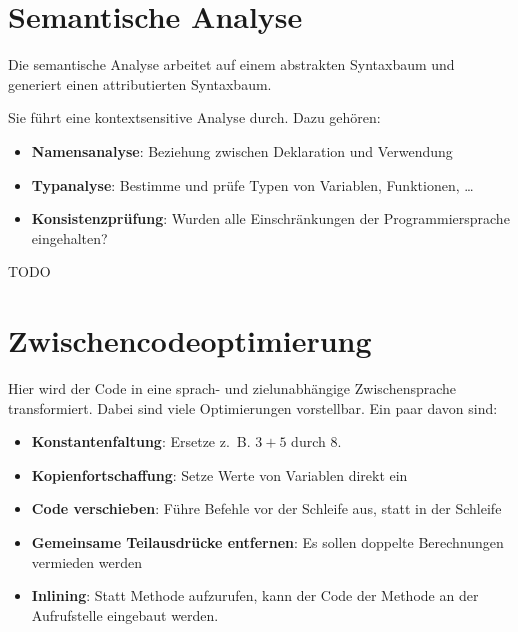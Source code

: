 \section{Semantische Analyse}%
Die semantische Analyse arbeitet auf einem abstrakten Syntaxbaum und generiert
einen attributierten Syntaxbaum.

Sie führt eine kontextsensitive Analyse durch. Dazu gehören:
\begin{itemize}
	\item \textbf{Namensanalyse}: Beziehung zwischen Deklaration und Verwendung
	\item \textbf{Typanalyse}: Bestimme und prüfe Typen von Variablen, Funktionen, \dots {}
	\item \textbf{Konsistenzprüfung}: Wurden alle Einschränkungen der Programmiersprache eingehalten?
\end{itemize}

\begin{beispiel}
    TODO
\end{beispiel}

\section{Zwischencodeoptimierung}
Hier wird der Code in eine sprach- und zielunabhängige Zwischensprache transformiert.
Dabei sind viele Optimierungen vorstellbar. Ein paar davon sind:
\begin{itemize}
    \item \textbf{Konstantenfaltung}: Ersetze z.~B. $3+5$ durch $8$.
    \item \textbf{Kopienfortschaffung}: Setze Werte von Variablen direkt ein
    \item \textbf{Code verschieben}: Führe Befehle vor der Schleife aus, statt in der Schleife 
    \item \textbf{Gemeinsame Teilausdrücke entfernen}: Es sollen doppelte Berechnungen vermieden werden 
    \item \textbf{Inlining}: Statt Methode aufzurufen, kann der Code der Methode an der Aufrufstelle eingebaut werden.
\end{itemize}

